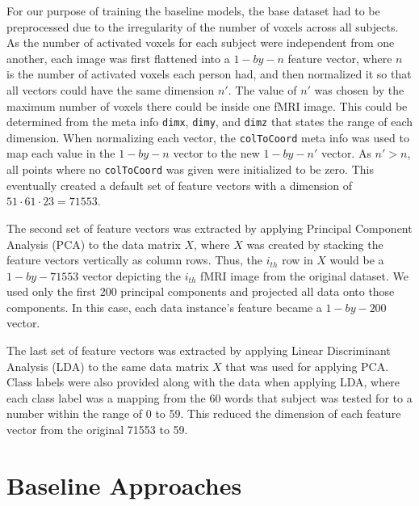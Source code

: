 \documentclass{article} %
\def\code#1{\texttt{#1}}
\begin{document}
For our purpose of training the baseline models, the base dataset had to be preprocessed due to the irregularity of the number of voxels across all subjects. As the number of activated voxels for each subject were independent from one another, each image was first flattened into a $1-by-n$ feature vector, where $n$ is the number of activated voxels each person had, and then normalized it so that all vectors could have the same dimension $n'$. The value of $n'$ was chosen by the maximum number of voxels there could be inside one fMRI image. This could be determined from the meta info \code{dimx}, \code{dimy}, and \code{dimz} that states the range of each dimension. When normalizing each vector, the \code{colToCoord} meta info was used to map each value in the $1-by-n$ vector to the new $1-by-n'$ vector. As $n' > n$, all points where no \code{colToCoord} was given were initialized to be zero. This eventually created a default set of feature vectors with a dimension of $51 \cdot 61 \cdot 23 = 71553$.

The second set of feature vectors was extracted by applying Principal Component Analysis (PCA) to the data matrix $X$, where $X$ was created by stacking the feature vectors vertically as column rows. Thus, the $i_{th}$ row in $X$ would be a $1-by-71553$ vector depicting the $i_{th}$ fMRI image from the original dataset. We used only the first 200 principal components and projected all data onto those components. In this case, each data instance's feature became a $1-by-200$ vector.

The last set of feature vectors was extracted by applying Linear Discriminant Analysis (LDA) to the same data matrix $X$ that was used for applying PCA. Class labels were also provided along with the data when applying LDA, where each class label was a mapping from the 60 words that subject was tested for to a number within the range of 0 to 59. This reduced the dimension of each feature vector from the original 71553 to 59.

\section{Baseline Approaches}
\end{document}
